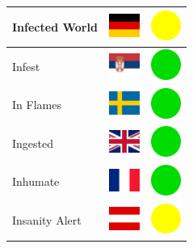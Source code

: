 \documentclass[12pt, a4paper, twoside]{report}
\begin{document}
\begin{center}
\begin{longtable}{|p{5cm}|p{2cm}|p{2cm}|}
 Infected World                                             & \includegraphics[width=1cm]{../4x3/de} &   \includegraphics[width=1cm]{../likes/m} \\ \hline
 Infest                                                     & \includegraphics[width=1cm]{../4x3/rs} &   \includegraphics[width=1cm]{../likes/y} \\ \hline
 In Flames                                                  & \includegraphics[width=1cm]{../4x3/se} &   \includegraphics[width=1cm]{../likes/y} \\ \hline
 Ingested                                                   & \includegraphics[width=1cm]{../4x3/gb} &   \includegraphics[width=1cm]{../likes/y} \\ \hline
 Inhumate                                                   & \includegraphics[width=1cm]{../4x3/fr} &   \includegraphics[width=1cm]{../likes/y} \\ \hline
 Insanity Alert                                             & \includegraphics[width=1cm]{../4x3/at} &   \includegraphics[width=1cm]{../likes/m} \\ \hline

\end{longtable}
\end{center}
\end{document}
